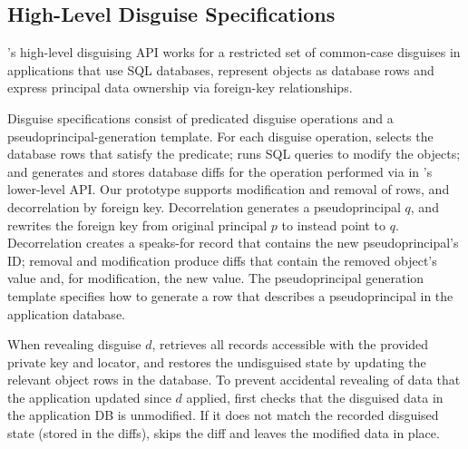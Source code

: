 \subsection{High-Level Disguise Specifications}
%
\sys's high-level disguising API works for a restricted set of common-case
disguises in applications that use SQL databases, represent objects as
database rows and express principal data ownership via foreign-key
relationships.
%

%
Disguise specifications consist of predicated disguise operations
and a pseudoprincipal-generation template.
%
For each disguise operation, \sys selects the database rows that satisfy
the predicate; runs SQL queries to modify the objects; and generates and
stores database diffs for the operation performed via  in
\sys's lower-level API.
%
Our prototype supports modification and removal of rows, and decorrelation
by foreign key.
%
Decorrelation generates a pseudoprincipal $q$, and rewrites the foreign
key from original principal $p$ to instead point to $q$.
%
Decorrelation creates a speaks-for record that contains the new
pseudoprincipal's ID; removal and modification produce diffs that contain
the removed object's value and, for modification, the new value.
%
The pseudoprincipal generation template specifies how to generate a row
that describes a pseudoprincipal in the application database.
%

When revealing disguise $d$, \sys retrieves all records accessible with
the provided private key and locator, and restores the undisguised state
by updating the relevant object rows in the database.
%
To prevent accidental revealing of data that the application updated
since $d$ applied, \sys first checks that the disguised data in the
application DB is unmodified.
%
If it does not match the recorded disguised state (stored in the diffs),
\sys skips the diff and leaves the modified data in place.
%


